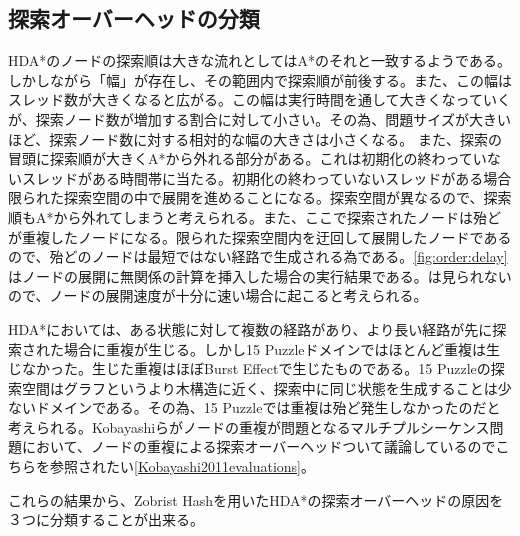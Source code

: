 \documentclass{jsarticle}
\begin{document}
\subsection{探索オーバーヘッドの分類}

HDA*のノードの探索順は大きな流れとしてはA*のそれと一致するようである。しかしながら「幅」が存在し、その範囲内で探索順が前後する。また、この幅はスレッド数が大きくなると広がる。この幅は実行時間を通して大きくなっていくが、探索ノード数が増加する割合に対して小さい。その為、問題サイズが大きいほど、探索ノード数に対する相対的な幅の大きさは小さくなる。
また、探索の冒頭に探索順が大きくA*から外れる部分がある。これは初期化の終わっていないスレッドがある時間帯に当たる。初期化の終わっていないスレッドがある場合限られた探索空間の中で展開を進めることになる。探索空間が異なるので、探索順もA*から外れてしまうと考えられる。また、ここで探索されたノードは殆どが重複したノードになる。限られた探索空間内を迂回して展開したノードであるので、殆どのノードは最短ではない経路で生成される為である。\ref{fig:order:delay}はノードの展開に無関係の計算を挿入した場合の実行結果である。は見られないので、ノードの展開速度が十分に速い場合に起こると考えられる。

HDA*においては、ある状態に対して複数の経路があり、より長い経路が先に探索された場合に重複が生じる。しかし15 Puzzleドメインではほとんど重複は生じなかった。生じた重複はほぼBurst Effectで生じたものである。15 Puzzleの探索空間はグラフというより木構造に近く、探索中に同じ状態を生成することは少ないドメインである。その為、15 Puzzleでは重複は殆ど発生しなかったのだと考えられる。Kobayashiらがノードの重複が問題となるマルチプルシーケンス問題において、ノードの重複による探索オーバーヘッドついて議論しているのでこちらを参照されたい\ref{Kobayashi2011evaluations}。

これらの結果から、Zobrist Hashを用いたHDA*の探索オーバーヘッドの原因を３つに分類することが出来る。
\end{document}
